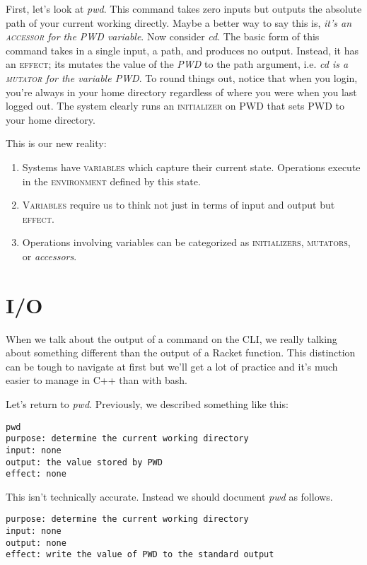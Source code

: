 \documentclass[]{tufte-handout}
\begin{document}
First, let's look at \textit{pwd}.  This command takes zero inputs but outputs the absolute path of your current working directly.  Maybe a better way to say this is, \textit{it's an \textsc{accessor} for the PWD variable}. Now consider \textit{cd}. The basic form of this command takes in a single input, a path, and produces no output.  Instead, it has an  \textsc{effect}; its mutates the value of the \textit{PWD} to the path argument, i.e. \textit{cd is a \textsc{mutator} for the variable PWD}.  To round things out, notice that when you login, you're always in your home directory regardless of where you were when you last logged out.  The system clearly runs an \textsc{initializer} on PWD that sets PWD to your home directory. 

This is our new reality:
\begin{enumerate}
\item Systems have \textsc{variables} which capture their current state. Operations execute in the \textsc{environment} defined by this state.
\item \textsc{Variables} require us to think not just in terms of input and output but \textsc{effect}. 
\item Operations involving variables can be categorized as \textsc{initializers}, \textsc{mutators}, or \textit{accessors}.  
\end{enumerate}

\section{I/O}

When we talk about the output of a command on the CLI, we really talking about something different than the output of a Racket function.  This distinction can be tough to navigate at first but we'll get a lot of practice and it's much easier to manage in C++ than with bash.  

Let's return to \textit{pwd}. Previously, we described something like this:
\begin{verbatim}
pwd
purpose: determine the current working directory
input: none
output: the value stored by PWD
effect: none
\end{verbatim}
This isn't technically accurate. Instead we should document \textit{pwd} as follows.
\begin{verbatim}
purpose: determine the current working directory 
input: none
output: none
effect: write the value of PWD to the standard output
\end{verbatim}
\end{document}
